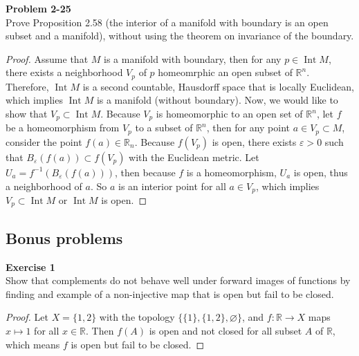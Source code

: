 \documentclass[12pt, a4paper]{article}
\theoremstyle{plain}
\newcommand{\R}{\mathbb{R}}
\DeclareMathOperator{\inter}{Int}
\def\epsilon{\varepsilon}
\newenvironment{exercise}[2][Exercise]
    { \begin{mdframed}[backgroundcolor=gray!20] \textbf{#1 #2} \\}
    {  \end{mdframed}}
\newenvironment{problem}[2][Problem]
    { \begin{mdframed}[backgroundcolor=gray!20] \textbf{#1 #2} \\}
    {  \end{mdframed}}
\begin{document}
\begin{problem}{2-25}
Prove Proposition 2.58 (the interior of a manifold with boundary is an open subset and a manifold), without using the theorem on invariance of the boundary.
\end{problem}
	\begin{proof}
	Assume that $M$ is a manifold with boundary, then for any $p\in\inter{M}$, there exists a neighborhood $V_p$ of $p$ homeomrphic an open subset of $\R^n$. Therefore, $\inter M$ is a second countable, Hausdorff space that is locally Euclidean, which implies $\inter M$ is a manifold (without boundary). Now, we would like to show that $V_p\subset \inter{M}$. Because $V_p$ is homeomorphic to an open set of $\R^n$, let $f$ be a homeomorphism from $V_p$ to a subset of $\R^n$, then for any point $a\in V_p\subset M$, consider the point $f(a)\in\R_n$. Because $f(V_p)$ is open, there exists $\epsilon>0$ such that $B_\epsilon(f(a))\subset f(V_p)$ with the Euclidean metric. Let $U_a=f^{-1}(B_\epsilon(f(a)))$, then because $f$ is a homeomorphism, $U_a$ is open, thus a neighborhood of $a$. So $a$ is an interior point for all $a\in V_p$, which implies $V_p\subset \inter{M}$ or $\inter{M}$ is open.
	\end{proof}
\subsection{Bonus problems}
\begin{exercise}{1}
 Show that complements do not behave well under forward images of functions by finding and example of a non-injective map that is open but fail to be closed.
\end{exercise}
	\begin{proof}
	Let $X=\{1,2\}$ with the topology $\{\{1\},\{1,2\},\varnothing\}$, and $f:\R\rightarrow X$ maps $x\mapsto 1$ for all $x\in \R$. Then $f(A)$ is open  and not closed for all subset $A$ of $\R$, which means $f$ is open but fail to be closed.
	\end{proof}
	
\end{document}

